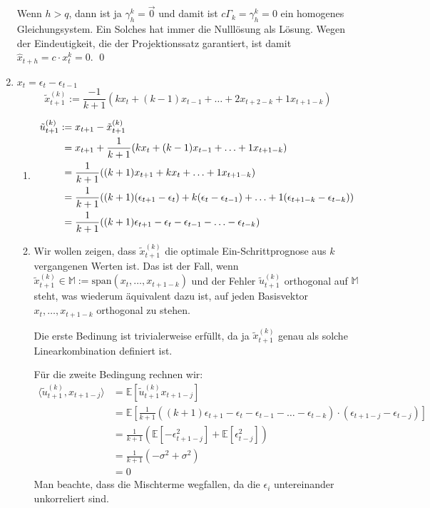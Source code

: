 \documentclass[a4paper,11pt,notitlepage,fullpage]{article}
\newcommand{\E}[1]{\mathbb E\left[#1\right]}
\begin{document}
\begin{enumerate}
Wenn $h>q$, dann ist ja $\gamma_h^k = \vec0$ und damit ist $c \Gamma_k = \gamma_h^k = 0$ ein homogenes Gleichungsystem. Ein Solches hat immer die Nulllösung als Lösung. Wegen der Eindeutigkeit, die der Projektionssatz garantiert, ist damit $\hat x_{t+h} = c \cdot x_t^k = 0$. \qed


\item $x_t = \epsilon_t - \epsilon_{t-1}$
$$
\tilde x_{t+1}^{(k)} := \frac{-1}{k+1} (k x_t + (k-1)x_{t-1} + \ldots + 2 x_{t+2-k} + 1 x_{t+1-k})
$$
\begin{enumerate}
\item 
\begin{align*}
\tilde u_{t+1}^{(k)} :\hspace{-0.3em}&= x_{t+1} - \tilde x_{t+1}^{(k)} \\
&= x_{t+1} + \frac{1}{k+1} (k x_t + (k-1)x_{t-1} + \ldots + 1 x_{t+1-k}) \\
&= \frac{1}{k+1} ((k+1) x_{t+1} + k x_t + \ldots + 1 x_{t+1-k}) \\
&= \frac{1}{k+1} ((k+1) (\epsilon_{t+1} - \epsilon_t) + k (\epsilon_t - \epsilon_{t-1}) + \ldots + 1 (\epsilon_{t+1-k} - \epsilon_{t-k})) \\
&= \frac{1}{k+1} ((k+1) \epsilon_{t+1} - \epsilon_t - \epsilon_{t-1} - \ldots - \epsilon_{t-k})
\end{align*}

\item Wir wollen zeigen, dass $\tilde x_{t+1}^{(k)}$ die optimale Ein-Schrittprognose aus $k$ vergangenen Werten ist. Das ist der Fall, wenn $\tilde x_{t+1}^{(k)} \in \mathbb M := \text{span}(x_t, \ldots, x_{t+1-k})$ und der Fehler $\tilde u_{t+1}^{(k)}$ orthogonal auf $\mathbb M$ steht, was wiederum äquivalent dazu ist, auf jeden Basisvektor $x_t, \ldots, x_{t+1-k}$ orthogonal zu stehen.

Die erste Bedinung ist trivialerweise erfüllt, da ja $\tilde x_{t+1}^{(k)}$ genau als solche Linearkombination definiert ist.

Für die zweite Bedingung rechnen wir:
\begin{align*}
\langle \tilde u_{t+1}^{(k)}, x_{t+1-j} \rangle &= \E{\tilde u_{t+1}^{(k)} x_{t+1-j}} \\
&= \E{\frac{1}{k+1} ((k+1) \epsilon_{t+1} - \epsilon_t - \epsilon_{t-1} - \ldots - \epsilon_{t-k}) \cdot (\epsilon_{t+1-j} - \epsilon_{t-j})} \\
&= \frac{1}{k+1} (\E{-\epsilon_{t+1-j}^2} + \E{\epsilon_{t-j}^2}) \\
&= \frac{1}{k+1} (-\sigma^2 + \sigma^2) \\
&= 0
\end{align*}
Man beachte, dass die Mischterme wegfallen, da die $\epsilon_i$ untereinander unkorreliert sind.


\end{enumerate}
\end{enumerate}
\end{document}

